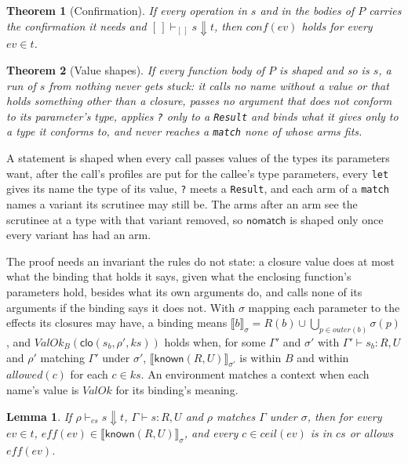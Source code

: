 \documentclass[11pt,a4paper]{article}
\newtheorem{theorem}{Theorem}
\newtheorem{lemma}{Lemma}
\newcommand{\allowed}{\mathit{allowed}}
\newcommand{\known}{\mathsf{known}}
\newcommand{\clo}{\mathsf{clo}}
\newcommand{\nsl}[1]{\texttt{#1}}
\begin{document}
\begin{theorem}[Confirmation]
If every operation in $s$ and in the bodies of $P$ carries the
confirmation it needs and $[\,] \vdash_{[\,]} s \Downarrow t$, then
$\mathit{conf}(ev)$ holds for every $ev \in t$.
\end{theorem}

\begin{theorem}[Value shapes]
If every function body of $P$ is shaped and so is $s$, a run of $s$ from
nothing never gets stuck: it calls no name without a value or that holds
something other than a closure, passes no argument that does not conform
to its parameter's type, applies \nsl{?} only to a \nsl{Result} and binds
what it gives only to a type it conforms to, and never reaches a
\nsl{match} none of whose arms fits.
\end{theorem}

A statement is shaped when every call passes values of the types its
parameters want, after the call's profiles are put for the callee's type
parameters, every \nsl{let} gives its name the type of its value,
\nsl{?} meets a \nsl{Result}, and each arm of a \nsl{match} names a
variant its scrutinee may still be. The arms after an arm see the
scrutinee at a type with that variant removed, so $\mathsf{nomatch}$ is
shaped only once every variant has had an arm.

The proof needs an invariant the rules do not state: a closure value does
at most what the binding that holds it says, given what the enclosing
function's parameters hold, besides what its own arguments do, and calls
none of its arguments if the binding says it does not. With $\sigma$ mapping each parameter to the
effects its closures may have, a binding means
$\llbracket b \rrbracket_\sigma = R(b) \cup \bigcup_{p \in \mathit{outer}(b)} \sigma(p)$,
and $\mathit{ValOk}_B(\clo(s_b, \rho', ks))$ holds when, for some
$\Gamma'$ and $\sigma'$ with $\Gamma' \vdash s_b : R, U$ and
$\rho'$ matching $\Gamma'$ under $\sigma'$,
$\llbracket \known(R, U) \rrbracket_{\sigma'}$ is within $B$ and within
$\allowed(c)$ for each $c \in ks$. An environment matches a context when
each name's value is $\mathit{ValOk}$ for its binding's meaning.

\begin{lemma}
If $\rho \vdash_{cs} s \Downarrow t$, $\Gamma \vdash s : R, U$ and $\rho$
matches $\Gamma$ under $\sigma$, then for every $ev \in t$,
$\mathit{eff}(ev) \in \llbracket \known(R, U) \rrbracket_\sigma$, and every
$c \in \mathit{ceil}(ev)$ is in $cs$ or allows $\mathit{eff}(ev)$.
\end{lemma}
\end{document}

